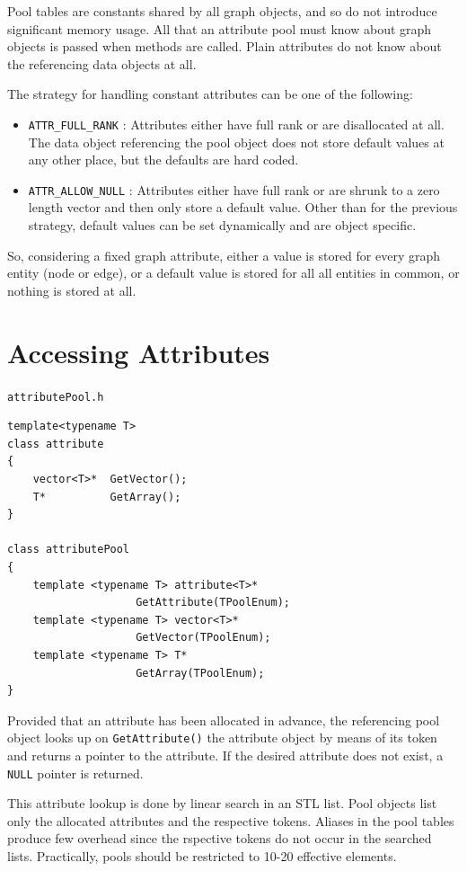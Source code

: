 \documentclass[a4paper,11pt,twoside]{book}
\begin{document}
\begin{multicols}{2}
Pool tables are constants shared by all graph objects, and so do not
introduce significant memory usage. All that an attribute pool must know about
graph objects is passed when methods are called. Plain attributes
do not know about the referencing data objects at all.

The strategy for handling constant attributes can be one of the following:
\begin{itemize}
\item \verb/ATTR_FULL_RANK/ : Attributes either have full rank or are disallocated
    at all. The data object referencing the pool object does not store default
    values at any other place, but the defaults are hard coded.
\item \verb/ATTR_ALLOW_NULL/ : Attributes either have full rank or are shrunk to
    a zero length vector and then only store a default value. Other than for the
    previous strategy, default values can be set dynamically and are object specific.
\end{itemize}
So, considering a fixed graph attribute, either a value is stored for every graph
entity (node or edge), or a default value is stored for all all entities in common,
or nothing is stored at all.


\section{Accessing Attributes}
\myinclude\verb/attributePool.h/
\begin{mymethods}
\begin{verbatim}
template<typename T>
class attribute
{
    vector<T>*  GetVector();
    T*          GetArray();
}

class attributePool
{
    template <typename T> attribute<T>*
                    GetAttribute(TPoolEnum);
    template <typename T> vector<T>*
                    GetVector(TPoolEnum);
    template <typename T> T*
                    GetArray(TPoolEnum);
}
\end{verbatim}
\end{mymethods}
Provided that an attribute has been allocated in advance, the referencing pool
object looks up on \verb/GetAttribute()/ the attribute object by means
of its token and returns a pointer to the attribute. If the desired attribute
does not exist, a \verb/NULL/ pointer is returned.

This attribute lookup is done by linear search in an STL list. Pool objects list
only the allocated attributes and the respective tokens. Aliases in the pool
tables produce few overhead since the rspective tokens do not occur in the searched
lists. Practically, pools should be restricted to 10-20 effective elements.


\end{multicols}
\end{document}
